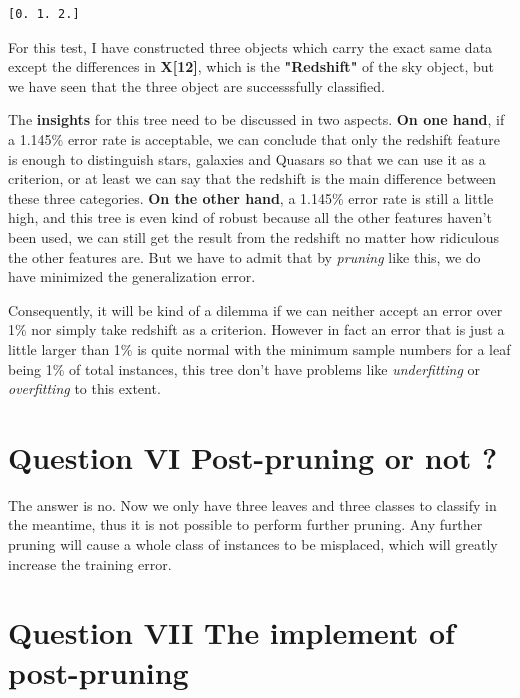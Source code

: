 \documentclass[11pt]{article}
\begin{document}
    \begin{Verbatim}[commandchars=\\\{\}]
[0. 1. 2.]

    \end{Verbatim}

    For this test, I have constructed three objects which carry the exact
same data except the differences in \textbf{X{[}12{]}}, which is the
\textbf{"Redshift"} of the sky object, but we have seen that the three
object are successsfully classified.

The \textbf{insights} for this tree need to be discussed in two aspects.
\textbf{On one hand}, if a 1.145\% error rate is acceptable, we can
conclude that only the redshift feature is enough to distinguish stars,
galaxies and Quasars so that we can use it as a criterion, or at least
we can say that the redshift is the main difference between these three
categories. \textbf{On the other hand}, a 1.145\% error rate is still a
little high, and this tree is even kind of robust because all the other
features haven't been used, we can still get the result from the
redshift no matter how ridiculous the other features are. But we have to
admit that by \emph{pruning} like this, we do have minimized the
generalization error.

Consequently, it will be kind of a dilemma if we can neither accept an
error over 1\% nor simply take redshift as a criterion. However in fact
an error that is just a little larger than 1\% is quite normal with the
minimum sample numbers for a leaf being 1\% of total instances, this
tree don't have problems like \emph{underfitting} or \emph{overfitting}
to this extent.

    \section{Question VI Post-pruning or not
?}\label{question-vi-post-pruning-or-not}

    The answer is no. Now we only have three leaves and three classes to
classify in the meantime, thus it is not possible to perform further
pruning. Any further pruning will cause a whole class of instances to be
misplaced, which will greatly increase the training error.

    \section{Question VII The implement of
post-pruning}\label{question-vii-the-implement-of-post-pruning}


        
    
    
\end{document}
